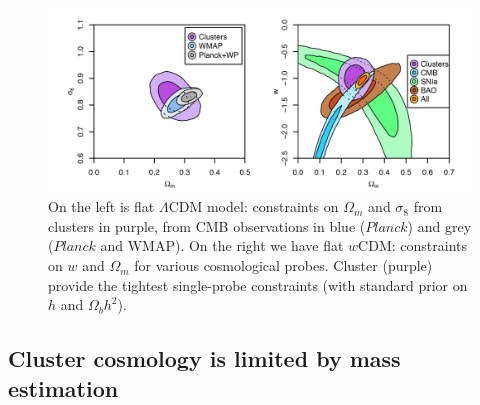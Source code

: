 \begin{figure}[H]
\includegraphics[width = \columnwidth]{figs/cosmology.png}
\caption{On the left is flat $\Lambda$CDM model: constraints on $\Omega_{m}$ and $\sigma_{8}$ from clusters in purple, from CMB observations in blue ($Planck$) and grey ($Planck$ and WMAP). On the right we have flat $w$CDM: constraints on $w$ and $\Omega_{m}$ for various cosmological probes. Cluster (purple) provide the tightest single-probe constraints \citep{mantz15} (with standard prior on $h$ and $\Omega_{b} h^{2}$).  }
\label{clustercosmology}
\end{figure}
\subsection{Cluster cosmology is limited by mass estimation}


